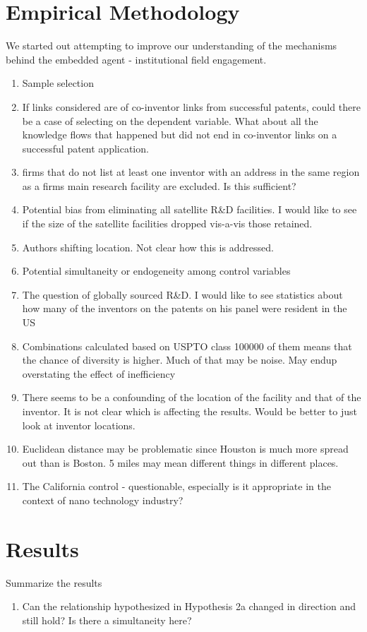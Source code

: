 \documentclass[12pt,letterpaper]{article}
\begin{document}
\section{Empirical Methodology}
We started out attempting to improve our understanding of the mechanisms behind the embedded agent - institutional field engagement. 
\begin{enumerate}
  \item Sample selection
    \item If links considered are of co-inventor links from successful patents, could there be a case of selecting on the dependent variable. What about all the knowledge flows that happened but did not end in co-inventor links on a successful patent application.
      \item firms that do not list at least one inventor with an address in the same region as a firm\textquotesingle s main research facility are excluded. Is this sufficient?
  \item Potential bias from eliminating all satellite R\&D facilities. I would like to see if the size of the satellite facilities dropped vis-a-vis those retained.
  \item Authors shifting location. Not clear how this is addressed.
  \item Potential simultaneity or endogeneity among control variables
  \item The question of globally sourced R\&D. I would like to see statistics about how many of the inventors on the patents on his panel were resident in the US
  \item Combinations calculated based on USPTO class 100000 of them means that the chance of diversity is higher. Much of that may be noise. May endup overstating the effect of inefficiency
  \item There seems to be a confounding of the location of the facility and that of the inventor. It is not clear which is affecting the results. Would be better to just look at inventor locations.
  \item Euclidean distance may be problematic since Houston is much more spread out than is Boston. 5 miles may mean different things in different places.
  \item The California control - questionable, especially is it appropriate in the context of nano technology industry?
\end{enumerate}

\section{Results}
Summarize the results
\begin{enumerate}
  \item Can the relationship hypothesized in Hypothesis 2a changed in direction and still hold? Is there a simultaneity here?
\end{enumerate}
\end{document}
